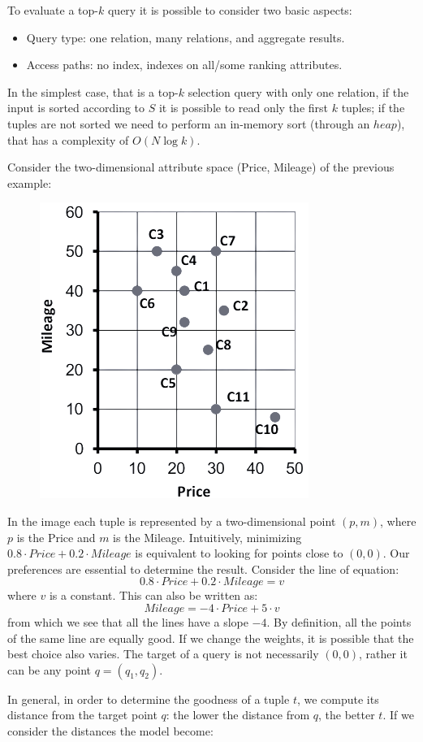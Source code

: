 \documentclass[12pt, a4paper]{report}
\newtheorem[style=M,bodystyle=\normalfont]{theorem}{Theorem}
\newtheorem[style=M,bodystyle=\normalfont]{corollary}{Corollary}
\newtheorem[style=M,bodystyle=\normalfont]{lemma}{Lemma}
\newtheorem[style=M,bodystyle=\normalfont]{definition}{Definition}
\begin{document}
    To evaluate a top-$k$ query it is possible to consider two basic aspects: 
    \begin{itemize}
        \item Query type: one relation, many relations, and aggregate results. 
        \item Access paths: no index, indexes on all/some ranking attributes. 
    \end{itemize}
    In the simplest case, that is a top-$k$ selection query with only one relation, if the input is sorted according to $S$ it is possible to read only the first $k$ tuples; 
    if the tuples are not sorted we need to perform an in-memory sort (through an $heap$), that has a complexity of $O(N\log{k})$. 
    \begin{example}
        Consider the two-dimensional attribute space (Price, Mileage) of the previous example: 
        \begin{figure}[H]
            \centering
            \includegraphics[width=0.25\linewidth]{images/ex1.png}
        \end{figure}
        In the image each tuple is represented by a two-dimensional point $(p, m)$, where $p$ is the Price and $m$ is the Mileage. Intuitively, minimizing
        $0.8\cdot Price + 0.2\cdot Mileage$ is equivalent to looking for points close to $(0,0)$. Our preferences are essential to determine the result. Consider the line of equation: 
        \[0.8\cdot Price + 0.2\cdot Mileage = v\]
        where $v$ is a constant. This can also be written as:
        \[Mileage = -4\cdot Price + 5\cdot v\]
        from which we see that all the lines have a slope $-4$. By definition, all the points of the same line are equally good. If we change the weights, it is possible 
        that the best choice also varies. 
        The target of a query is not necessarily $(0,0)$, rather it can be any point $q=(q_1,q_2)$. 
    \end{example}
    In general, in order to determine the goodness of a tuple $t$, we compute its distance from the target point $q$: the lower the distance from $q$, the better $t$. 
    If we consider the distances the model become: 
\end{document}
